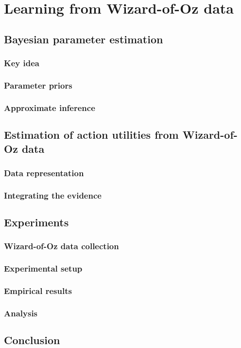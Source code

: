 
\chapter{Learning from Wizard-of-Oz data}
\label{chap:wozlearning}


\section{Bayesian parameter estimation}

\subsection{Key idea}

\subsection{Parameter priors}


\subsection{Approximate inference}

\section{Estimation of action utilities from Wizard-of-Oz data}

\subsection{Data representation}

\subsection{Integrating the evidence}

\section{Experiments}
\label{sec:wozlearning-experiments}

\subsection{Wizard-of-Oz data collection}

\subsection{Experimental setup}

\subsection{Empirical results}

\subsection{Analysis}

\section{Conclusion}